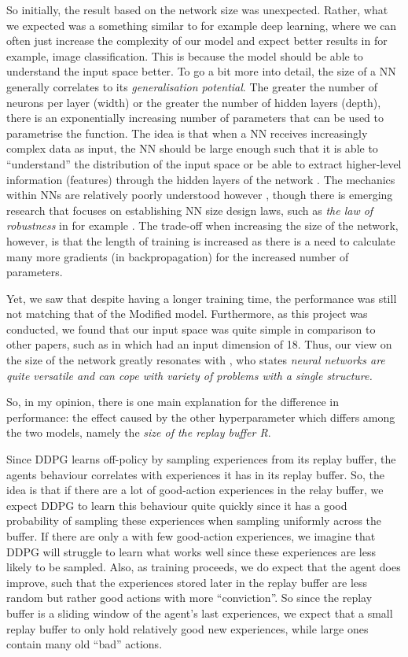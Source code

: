 So initially, the result based on the network size was unexpected. Rather, what we expected was a something similar to for example deep learning, where we can often just increase the complexity of our model and expect better results in for example, image classification. This is because the model should be able to understand the input space better. To go a bit more into detail, the size of a NN generally correlates to its \textit{generalisation potential}. The greater the number of neurons per layer (width) or the greater the number of hidden layers (depth), there is an exponentially increasing number of parameters that can be used to parametrise the function. 
The idea is that when a NN receives increasingly complex data as input, the NN should be large enough such that it is able to ``understand'' the distribution of the input space or be able to extract higher-level information (features) through the hidden layers of the network \cite{DLUnipd}. The mechanics within NNs are relatively poorly understood however \cite{XAI}, though there is emerging research that focuses on establishing NN size design laws, such as \textit{the law of robustness} in for example \cite{bubeck2021aLawOfRobustness}.
The trade-off when increasing the size of the network, however, is that the length of training is increased as there is a need to calculate many more gradients (in backpropagation) for the increased number of parameters.  

Yet, we saw that despite having a longer training time, the performance was still not matching that of the Modified model. Furthermore, as this project was conducted, we found that our input space was quite simple in comparison to other papers, such as in \cite{song2021droneRacing} which had an input dimension of 18. Thus, our view on the size of the network greatly resonates with \cite{ControlofQuadrotorRL}, who states \textit{neural networks are quite versatile and can cope with variety of problems with a single structure.}

So, in my opinion, there is one main explanation for the difference in performance: the effect caused by the other  hyperparameter which differs among the two models, namely the \textit{size of the replay buffer R}.

Since DDPG learns off-policy by sampling experiences from its replay buffer, the agents behaviour correlates with experiences it has in its replay buffer. So, the idea is that if there are a lot of good-action experiences in the relay buffer, we expect DDPG to learn this behaviour quite quickly since it has a good probability of sampling these experiences when sampling uniformly across the buffer. If there are only a with few good-action experiences, we imagine that DDPG will struggle to learn what works well since these experiences are less likely to be sampled. Also, as training proceeds, we do expect that the agent does improve, such that the experiences stored later in the replay buffer are less random but rather good actions with more ``conviction''. So since the replay buffer is a sliding window of the agent's last experiences, we expect that a small replay buffer to only hold relatively good new experiences, while large ones contain many old ``bad'' actions. 

